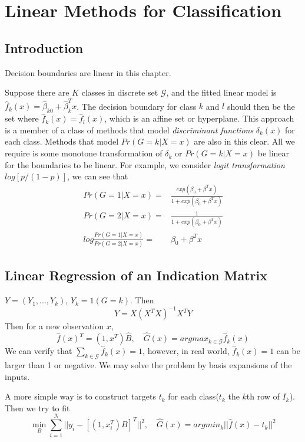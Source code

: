 \chapter{Linear Methods for Classification}
\section{Introduction}
Decision boundaries are linear in this chapter. 

Suppose there are $K$ classes in discrete set $\mathcal{G}$, and the fitted linear model is 
$\hat{f}_k(x)=\hat{\beta}_{k0}+\hat{\beta}_k^Tx$. The decision boundary for class $k$ 
and $l$ should then be the set where $\hat{f}_k(x)=\hat{f}_l(x)$, which is an affine
set or hyperplane. This approach is a member of a class of methods that model 
\textit{discriminant functions} $\delta_k(x)$ for each class. Methods that model
$Pr(G=k|X=x)$ are also in this clear. All we require is some monotone transformation
of $\delta_k$ or $Pr(G=k|X=x)$ be linear for the boundaries to be linear. For example, 
we consider \textit{logit transformation} $log[p/(1-p)]$, we can see that
\begin{align*}
Pr(G=1|X=x)=&\frac{exp(\beta_0+\beta^Tx)}{1+exp(\beta_0+\beta^Tx)}\\
Pr(G=2|X=x)=&\frac{1}{1+exp(\beta_0+\beta^Tx)}\\
log\frac{Pr(G=1|X=x)}{Pr(G=2|X=x)}=&\beta_0+\beta^Tx
\end{align*}

\section{Linear Regression of an Indication Matrix}
$Y=(Y_1,...,Y_k)$, $Y_k=1(G=k)$. Then 
\begin{equation*}
\hat{Y}=X(X^TX)^{-1}X^TY
\end{equation*}
Then for a new observation $x$, 
\begin{equation*}
\hat{f}(x)^T=(1,x^T)\hat{B},\quad \hat{G}(x)=argmax_{k\in\mathcal{G}}\hat{f}_k(x)
\end{equation*}
We can verify that $\sum_{k\in\mathcal{G}}\hat{f}_k(x)=1$, however, in real world, 
$\hat{f}_k(x)=1$ can be larger than 1 or negative. We may solve the problem by basis 
expansions of the inputs. 

A more simple way is to construct targets $t_k$ for each class($t_k$ the $k$th row of 
$I_k$). Then we try to fit
\begin{equation*}
\min_B\sum_{i=1}^N||y_i-[(1,x_i^T)B]^T||^2,\quad \hat{G}(x)=argmin_k||\hat{f}(x)-t_k||^2
\end{equation*}

